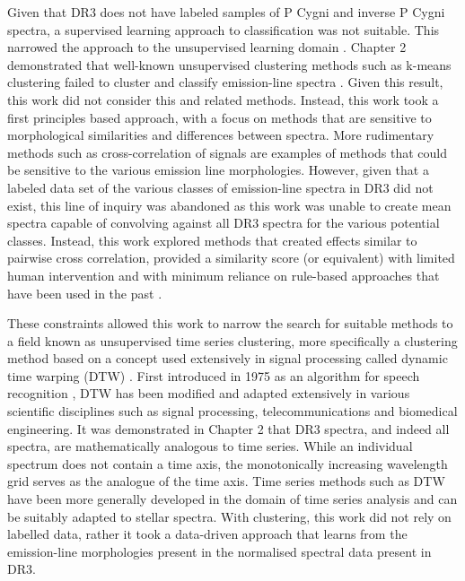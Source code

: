 Given that DR3 does not have labeled samples of P Cygni and inverse P Cygni spectra, a supervised learning approach to classification was not suitable. This narrowed the approach to the unsupervised learning domain \citep{hastie2009elements}. Chapter 2 demonstrated that well-known unsupervised clustering methods such as k-means clustering failed to cluster and classify emission-line spectra \citep{garcia2018machine}. Given this result, this work did not consider this and related methods. Instead, this work took a first principles based approach, with a focus on methods that are sensitive to morphological similarities and differences between spectra. More rudimentary methods such as cross-correlation of signals are examples of methods that could be sensitive to the various emission line morphologies. However, given that a labeled data set of the various classes of emission-line spectra in DR3 did not exist, this line of inquiry was abandoned as this work was unable to create mean spectra capable of convolving against all DR3 spectra for the various potential classes. Instead, this work explored methods that created effects similar to pairwise cross correlation, provided a similarity score (or equivalent) with limited human intervention and with minimum reliance on rule-based approaches that have been used in the past \citep{traven2015gaia}. 

These constraints allowed this work to narrow the search for suitable methods to a field known as unsupervised time series clustering, more specifically a clustering method based on a concept used extensively in signal processing called dynamic time warping (DTW) \citep{kruskal1983overview}. First introduced in 1975 as an algorithm for speech recognition \citep{itakura1975minimum}, DTW has been modified and adapted extensively in various scientific disciplines such as signal processing, telecommunications and biomedical engineering. It was demonstrated in Chapter 2 that DR3 spectra, and indeed all spectra, are mathematically analogous to time series. While an individual spectrum does not contain a time axis, the monotonically increasing wavelength grid serves as the analogue of the time axis. Time series methods such as DTW have been more generally developed in the domain of time series analysis \citep{nielsen2019practical} and can be suitably adapted to stellar spectra. With clustering, this work did not rely on labelled data, rather it took a data-driven approach that learns from the emission-line morphologies present in the normalised spectral data present in DR3.

